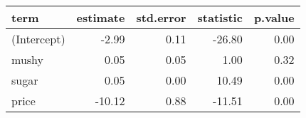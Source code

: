 \begin{tabular}{lrrrr}
  \hline
term & estimate & std.error & statistic & p.value \\ 
  \hline
(Intercept) & -2.99 & 0.11 & -26.80 & 0.00 \\ 
  mushy & 0.05 & 0.05 & 1.00 & 0.32 \\ 
  sugar & 0.05 & 0.00 & 10.49 & 0.00 \\ 
  price & -10.12 & 0.88 & -11.51 & 0.00 \\ 
   \hline
\end{tabular}
